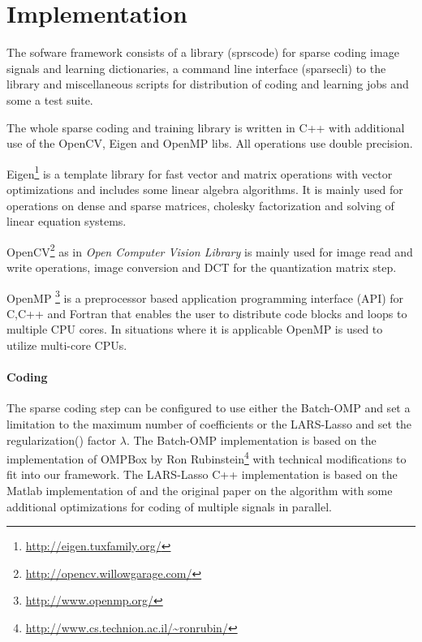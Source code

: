 \section{Implementation}
The sofware framework consists of a library (sprscode) for sparse coding image
signals and learning dictionaries, a command line interface (sparsecli) to the
library and miscellaneous scripts for distribution of coding and learning jobs
and some a test suite.

The whole sparse coding and training library is written in C++ with
additional use of the OpenCV, Eigen and OpenMP libs. All operations use double
precision. 

Eigen\footnote{\url{http://eigen.tuxfamily.org/}}
is a template library for fast vector and matrix operations with vector
optimizations and includes some linear algebra algorithms. It is mainly used for
operations on dense and sparse matrices, cholesky factorization and solving of
linear equation systems. 

OpenCV\footnote{\url{http://opencv.willowgarage.com/}} as
in \emph{Open Computer Vision Library} is mainly used for
image read and write operations, image conversion and DCT for the
quantization matrix step. 

OpenMP \footnote{\url{http://www.openmp.org/}} is a preprocessor
based application programming interface (API) for C,C++ and Fortran that enables
the user to distribute code blocks and loops to multiple CPU cores. In
situations where it is applicable OpenMP is used to utilize multi-core CPUs. 



\paragraph{Coding}
The sparse coding step can be configured to use either the Batch-OMP and 
set a limitation to the maximum number of coefficients or the LARS-Lasso 
and set the regularization() factor $\lambda$.
The Batch-OMP implementation is based on the implementation
of OMPBox by Ron
 Rubinstein\footnote{\url{http://www.cs.technion.ac.il/~ronrubin/}} with
technical modifications to fit into our
framework. The LARS-Lasso C++ implementation is based on the Matlab
implementation of\cite{Strand2005} and the original
paper\cite{Efron2004} on the algorithm with some additional optimizations
for coding of multiple signals in parallel. 

